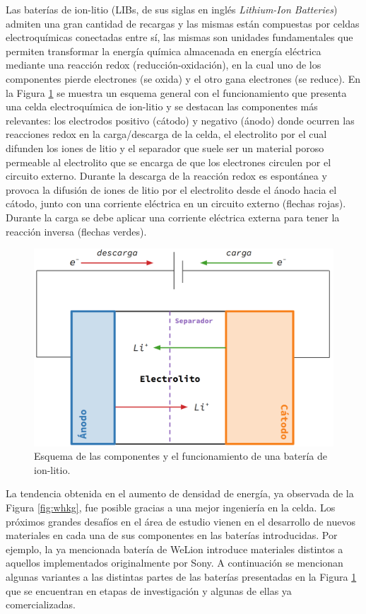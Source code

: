 Las baterías de ion-litio (LIBs, de sus siglas en inglés \textit{Lithium-Ion Batteries}) 
admiten una gran cantidad de recargas y las mismas están 
compuestas por celdas electroquímicas conectadas entre sí, las mismas son unidades 
fundamentales que permiten transformar la energía química almacenada en energía
eléctrica mediante una reacción redox (reducción-oxidación), en la cual uno de los 
componentes pierde electrones (se oxida) y el otro gana electrones (se reduce).
En la Figura \ref{fig:esquema-bateria} se muestra un esquema general con el 
funcionamiento que presenta una celda electroquímica de ion-litio y se destacan 
las componentes más relevantes: los electrodos positivo (cátodo) y negativo (ánodo) 
donde ocurren las reacciones redox en la carga/descarga de la celda, el electrolito 
por el cual difunden los iones de litio y el separador que suele ser un material 
poroso permeable al electrolito que se encarga de que los electrones circulen por 
el circuito externo. Durante la descarga de la reacción redox es espontánea y 
provoca la difusión de iones de litio por el electrolito desde el ánodo hacia el 
cátodo, junto con una corriente eléctrica en un circuito externo (flechas rojas). 
Durante la carga se debe aplicar una corriente eléctrica externa para tener la 
reacción inversa (flechas verdes).
\begin{figure}[h!]
    \centering
    \includegraphics[width=.8\textwidth]{Introduccion/baterias/esquema_bateria.png}
    \caption{Esquema de las componentes y el funcionamiento de una batería de 
    ion-litio.}
    \label{fig:esquema-bateria}
\end{figure}

La tendencia obtenida en el aumento de densidad de energía, ya observada de la 
Figura \ref{fig:whkg}, fue posible gracias a una mejor ingeniería en la celda. 
Los próximos grandes desafíos en el área de estudio vienen en el desarrollo de 
nuevos materiales en cada una de sus componentes en las baterías introducidas.
Por ejemplo, la ya mencionada batería de WeLion introduce materiales distintos 
a aquellos implementados originalmente por Sony. A continuación se mencionan
algunas variantes a las distintas partes de las baterías presentadas en la
Figura \ref{fig:esquema-bateria} que se encuentran en etapas de investigación 
y algunas de ellas ya comercializadas.

